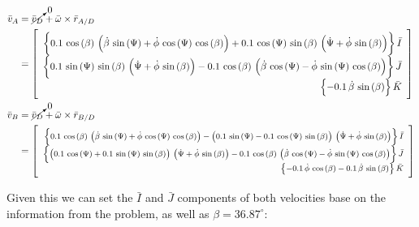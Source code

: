 \documentclass[12pt, letterpaper]{../assignment}
\begin{document}
\begin{equation*}
    \begin{aligned}
        \bar{v}_A &= \cancelto{0}{\bar{v}_D} + \bar{\omega} \times \bar{r}_{A/D}\\
                  &= \left[\begin{array}{r}
                    \left\{0.1\,\cos\left(\beta\right)\,\left(\dot{\beta }\,\sin\left(\Psi\right)+\dot{\phi }\,\cos\left(\Psi\right)\,\cos\left(\beta\right)\right)+0.1\,\cos\left(\Psi\right)\,\sin\left(\beta\right)\,\left(\dot{\Psi }+\dot{\phi }\,\sin\left(\beta\right)\right)\right\}\bar{I}\\
                    \left\{0.1\,\sin\left(\Psi\right)\,\sin\left(\beta\right)\,\left(\dot{\Psi }+\dot{\phi }\,\sin\left(\beta\right)\right)-0.1\,\cos\left(\beta\right)\,\left(\dot{\beta }\,\cos\left(\Psi\right)-\dot{\phi }\,\sin\left(\Psi\right)\,\cos\left(\beta\right)\right)\right\}\bar{J}\\
                    \left\{-0.1\,\dot{\beta }\,\sin\left(\beta\right)\right\}\bar{K}
                \end{array}\right]\\
        \bar{v}_B &= \cancelto{0}{\bar{v}_D} + \bar{\omega} \times \bar{r}_{B/D}\\
                  &= \footnotesize \left[\begin{array}{r} 
                    \left\{0.1\,\cos\left(\beta\right)\,\left(\dot{\beta }\,\sin\left(\Psi\right)+\dot{\phi }\,\cos\left(\Psi\right)\,\cos\left(\beta\right)\right)-\left(0.1\,\sin\left(\Psi\right)-0.1\,\cos\left(\Psi\right)\,\sin\left(\beta\right)\right)\,\left(\dot{\Psi }+\dot{\phi }\,\sin\left(\beta\right)\right)\right\}\bar{I}\\
                    \left\{\left(0.1\,\cos\left(\Psi\right)+0.1\,\sin\left(\Psi\right)\,\sin\left(\beta\right)\right)\,\left(\dot{\Psi }+\dot{\phi }\,\sin\left(\beta\right)\right)-0.1\,\cos\left(\beta\right)\,\left(\dot{\beta }\,\cos\left(\Psi\right)-\dot{\phi }\,\sin\left(\Psi\right)\,\cos\left(\beta\right)\right)\right\}\bar{J}\\
                    \left\{-0.1\,\dot{\phi }\,\cos\left(\beta\right)-0.1\,\dot{\beta }\,\sin\left(\beta\right)\right\}\bar{K}
                \end{array}\right]\\       
    \end{aligned}
\end{equation*}

Given this we can set the $\bar{I}$ and $\bar{J}$ components of both velocities base on the information from the problem, as well as $\beta = 36.87^\circ$:
\end{document}
